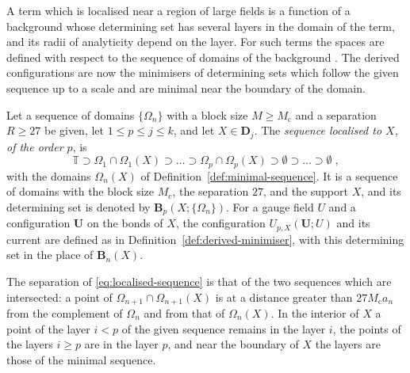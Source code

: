 \documentclass[11pt]{preprint}
\numberwithin{equation}{section}
\begin{document}
A term which is localised near a region of large fields is a function of a background whose determining set has several layers in the domain of the term, and its radii of analyticity depend on the layer. For such terms the spaces are defined with respect to the sequence of domains of the background \cite[(2.34)--(2.39), p.~261]{BalabanCRE}. The derived configurations are now the minimisers of determining sets which follow the given sequence up to a scale and are minimal near the boundary of the domain.

\begin{definition}\label{def:localised-sequence}
Let a sequence of domains $\{ \Omega_n \}$ with a block size $M \geqslant M_{\mathrm c}$ and a separation $R \geqslant 27$ be given, let $1 \leqslant p \leqslant j \leqslant k$, and let $X \in \mathbf D_j$. The \emph{sequence localised to $X$, of the order $p$}, is
\begin{equation}\label{eq:localised-sequence}
    \mathbb T \supset \Omega_1 \cap \Omega_1(X) \supset \dots \supset \Omega_p \cap \Omega_p(X) \supset \emptyset \supset \dots \supset \emptyset\;,
\end{equation}
with the domains $\Omega_n(X)$ of Definition~\ref{def:minimal-sequence}. It is a sequence of domains with the block size $M_{\mathrm c}$, the separation $27$, and the support $X$, and its determining set is denoted by $\mathbf B_p(X; \{ \Omega_n \})$. For a gauge field $U$ and a configuration $\mathbf U$ on the bonds of $X$, the configuration $U_{p,X}(\mathbf U; U)$ and its current are defined as in Definition~\ref{def:derived-minimiser}, with this determining set in the place of $\mathbf B_n(X)$.
\end{definition}

The separation of \eqref{eq:localised-sequence} is that of the two sequences which are intersected: a point of $\Omega_{n+1} \cap \Omega_{n+1}(X)$ is at a distance greater than $27M_{\mathrm c}a_n$ from the complement of $\Omega_n$ and from that of $\Omega_n(X)$. In the interior of $X$ a point of the layer $i < p$ of the given sequence remains in the layer $i$, the points of the layers $i \geqslant p$ are in the layer $p$, and near the boundary of $X$ the layers are those of the minimal sequence.
\end{document}
